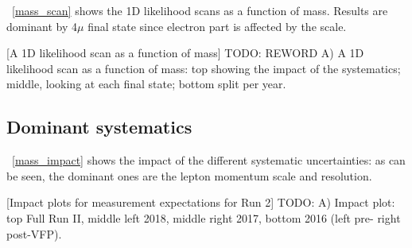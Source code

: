 \figurename~\ref{mass_scan} shows the 1D likelihood scans as a function of mass.
Results are dominant by 4$\mu$ final state since electron part is affected by the scale.
\begin{multiFigure}
    \centering
        [A 1D likelihood scan as a function of mass]
        {TODO: REWORD
        \;A) 
        A 1D likelihood scan as a function of mass: top showing the impact of the systematics;
        middle, looking at each final state; bottom split per year.}
    \label{mass_scan}
\end{multiFigure}

\subsection{Dominant systematics}
\figurename~\ref{mass_impact} shows the impact of the different systematic uncertainties: as can be seen,
the dominant ones are the lepton momentum scale and resolution.
\begin{multiFigure}
    \centering
        [Impact plots for \mH measurement expectations for Run 2]
        {TODO:
        \;A) 
        Impact plot: top Full Run II, middle left 2018, middle right 2017, bottom
        2016 (left pre- right post-VFP).}
    \label{mass_impact}
\end{multiFigure}

